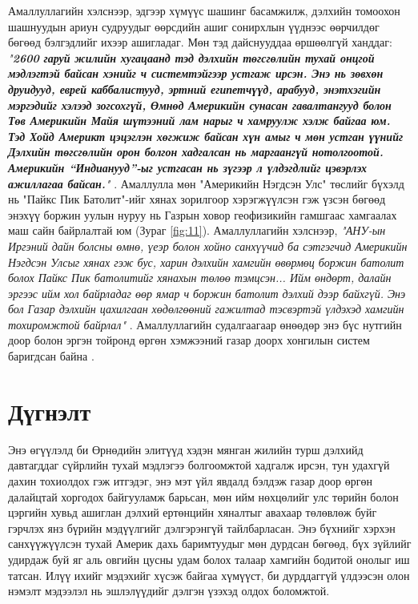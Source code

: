 \documentclass[10pt,twocolumn,letterpaper]{article}
\begin{document}
{Амаллуллагийн хэлснээр, эдгээр хүмүүс шашинг басамжилж, дэлхийн томоохон шашнуудын ариун судруудыг өөрсдийн ашиг сонирхлын үүднээс өөрчилдөг бөгөөд бэлгэдлийг ихээр ашигладаг. Мөн тэд дайснууддаа өршөөлгүй ханддаг: \textit{"\textbf{2600 гаруй жилийн хугацаанд тэд дэлхийн төгсгөлийн тухай онцгой мэдлэгтэй байсан хэнийг ч системтэйгээр устгаж ирсэн. Энэ нь зөвхөн друидууд, еврей каббалистууд, эртний египетчүүд, арабууд, энэтхэгийн мэргэдийг хэлээд зогсохгүй, Өмнөд Америкийн сунасан гавалтангууд болон Төв Америкийн Майя шүтээний лам нарыг ч хамруулж хэлж байгаа юм. Тэд Хойд Америкт цэцэглэн хөгжиж байсан хүн амыг ч мөн устган үүнийг Дэлхийн төгсгөлийн орон болгон хадгалсан нь маргаангүй нотолгоотой. Америкийн “Индианууд”-ыг устгасан нь зүгээр л үлдэгдлийг цэвэрлэх ажиллагаа байсан.}"} \cite{33,34}.
Амаллулла мөн "Америкийн Нэгдсэн Улс" төслийг бүхэлд нь "Пайкс Пик Батолит"-ийг хянах зорилгоор хэрэгжүүлсэн гэж үзсэн бөгөөд энэхүү боржин уулын нуруу нь Газрын ховор геофизикийн гамшгаас хамгаалах маш сайн байрлалтай юм (Зураг \ref{fig:11}). Амаллуллагийн хэлснээр, \textit{"АНУ-ын Иргэний дайн болсны өмнө, үеэр болон хойно санхүүчид ба сэтгэгчид Америкийн Нэгдсэн Улсыг хянах гэж бус, харин дэлхийн хамгийн өвөрмөц боржин батолит болох Пайкс Пик батолитийг хянахын төлөө тэмцсэн... Ийм өндөрт, далайн эргээс ийм хол байрладаг өөр ямар ч боржин батолит дэлхий дээр байхгүй. Энэ бол Газар дэлхийн цахилгаан хөдөлгөөний гажилтад тэсвэртэй үлдэхэд хамгийн тохиромжтой байрлал"} \cite{33,34}. Амаллуллагийн судалгаагаар өнөөдөр энэ бүс нутгийн доор болон эргэн тойронд өргөн хэмжээний газар доорх хонгилын систем баригдсан байна \cite{36}.

\section{Дүгнэлт}

Энэ өгүүлэлд би Өрнөдийн элитүүд хэдэн мянган жилийн турш дэлхийд давтагддаг сүйрлийн тухай мэдлэгээ болгоомжтой хадгалж ирсэн, тун удахгүй дахин тохиолдох гэж итгэдэг, энэ мэт үйл явдалд бэлдэж газар доор өргөн далайцтай хоргодох байгууламж барьсан, мөн ийм нөхцөлийг улс төрийн болон цэргийн хувьд ашиглан дэлхий ертөнцийн хяналтыг авахаар төлөвлөж буйг гэрчлэх янз бүрийн мэдүүлгийг дэлгэрэнгүй тайлбарласан. Энэ бүхнийг хэрхэн санхүүжүүлсэн тухай Америк дахь баримтуудыг мөн дурдсан бөгөөд, бүх зүйлийг удирдаж буй яг аль овгийн цусны удам болох талаар хамгийн бодитой онолыг иш татсан. Илүү ихийг мэдэхийг хүсэж байгаа хүмүүст, би дурддаггүй үлдээсэн олон нэмэлт мэдээлэл нь эшлэлүүдийг дэлгэн үзэхэд олдох боломжтой.

}
\end{document}
